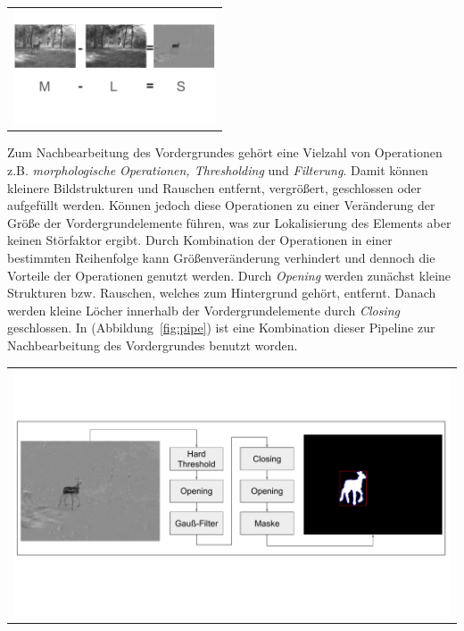 \begin{center}
\begin{tabular}{c}
\includegraphics[width=6cm]{img/Segmentierung/foreground-image}
\end{tabular}
\label{fig:foreground}
\end{center}
\noindent Zum Nachbearbeitung des Vordergrundes gehört eine Vielzahl von Operationen 
z.B. \textit{morphologische Operationen, Thresholding} und \textit{Filterung}.
Damit können kleinere Bildstrukturen und Rauschen entfernt, vergrößert, geschlossen oder aufgefüllt werden. Können jedoch diese Operationen zu einer Veränderung der Größe der Vordergrundelemente führen, was zur Lokalisierung des Elements aber keinen Störfaktor ergibt. Durch Kombination der Operationen in einer bestimmten Reihenfolge kann Größenveränderung verhindert und dennoch die Vorteile der Operationen genutzt werden. Durch \textit{Opening} werden zunächst kleine Strukturen bzw. Rauschen, welches zum Hintergrund gehört, entfernt. Danach werden kleine Löcher innerhalb der Vordergrundelemente durch \textit{Closing} geschlossen. In (Abbildung~\ref{fig:pipe}) ist eine Kombination dieser  Pipeline zur Nachbearbeitung des Vordergrundes benutzt worden.
\begin{center}
\begin{tabular}{c}
\includegraphics[trim={0 3cm 0cm 3cm},clip=true,width=13cm]{img/Segmentierung/pipe.pdf}
\end{tabular}
\label{fig:pipe}
\end{center}
